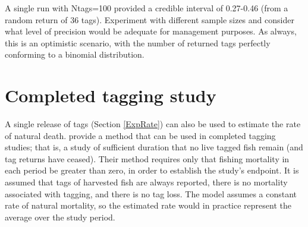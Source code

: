 \documentclass[
]{krantz}
\begin{document}
A single run with Ntags=100 provided a credible interval of 0.27-0.46 (from a random return of 36 tags). Experiment with different sample sizes and consider what level of precision would be adequate for management purposes. As always, this is an optimistic scenario, with the number of returned tags perfectly conforming to a binomial distribution.

\hypertarget{Hearn}{%
\section{Completed tagging study}\label{Hearn}}

A single release of tags (Section \ref{ExpRate}) can also be used to estimate the rate of natural death. \citet{hearn.etal1987} provide a method that can be used in completed tagging studies; that is, a study of sufficient duration that no live tagged fish remain (and tag returns have ceased). Their method requires only that fishing mortality in each period be greater than zero, in order to establish the study's endpoint. It is assumed that tags of harvested fish are always reported, there is no mortality associated with tagging, and there is no tag loss. The model assumes a constant rate of natural mortality, so the estimated rate would in practice represent the average over the study period.
\end{document}
